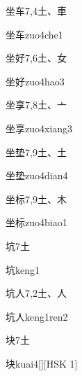 \begin{entry}{坐车}{7,4}{⼟、⾞}
  \begin{phonetics}{坐车}{zuo4che1}
  \end{phonetics}
\end{entry}

\begin{entry}{坐好}{7,6}{⼟、⼥}
  \begin{phonetics}{坐好}{zuo4hao3}
  \end{phonetics}
\end{entry}

\begin{entry}{坐享}{7,8}{⼟、⼇}
  \begin{phonetics}{坐享}{zuo4xiang3}
  \end{phonetics}
\end{entry}

\begin{entry}{坐垫}{7,9}{⼟、⼟}
  \begin{phonetics}{坐垫}{zuo4dian4}
  \end{phonetics}
\end{entry}

\begin{entry}{坐标}{7,9}{⼟、⽊}
  \begin{phonetics}{坐标}{zuo4biao1}
  \end{phonetics}
\end{entry}

\begin{entry}{坑}{7}{⼟}
  \begin{phonetics}{坑}{keng1}
  \end{phonetics}
\end{entry}

\begin{entry}{坑人}{7,2}{⼟、⼈}
  \begin{phonetics}{坑人}{keng1ren2}
  \end{phonetics}
\end{entry}

\begin{entry}{块}{7}{⼟}
  \begin{phonetics}{块}{kuai4}[][HSK 1]
  \end{phonetics}
\end{entry}

